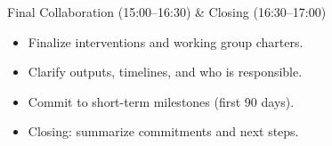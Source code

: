 \documentclass[11pt, aspectratio=169]{beamer}
\begin{document}
\begin{frame}{Final Collaboration (15:00--16:30) \& Closing (16:30--17:00)}
  \begin{itemize}
    \item Finalize interventions and working group charters.
    \item Clarify outputs, timelines, and who is responsible.
    \item Commit to short-term milestones (first 90 days).
    \item Closing: summarize commitments and next steps.
  \end{itemize}

\end{frame}
\end{document}
